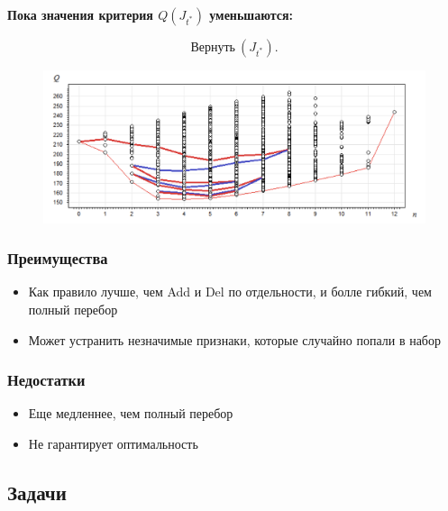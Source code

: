 \textbf{Пока значения критерия \( Q(J_{t^*}) \) уменьшаются:}

\[ \text{Вернуть} \ ( J_{t^*} ).\]


\begin{figure}[h!!!!!!!!!!]
	\centering
	\includegraphics[width=1\linewidth]{add-del.png}
\end{figure}



\subsubsection*{Преимущества}

\begin{itemize}

    \item Как правило лучше, чем Add и Del по отдельности, и болле гибкий, чем полный перебор

    \item Может устранить незначимые признаки, которые случайно попали в набор
    
\end{itemize}

\subsubsection*{Недостатки}

\begin{itemize}

    \item Еще медленнее, чем полный перебор

    \item Не гарантирует оптимальность
    
\end{itemize}



\bigskip
\bigskip




\subsection*{Задачи}



